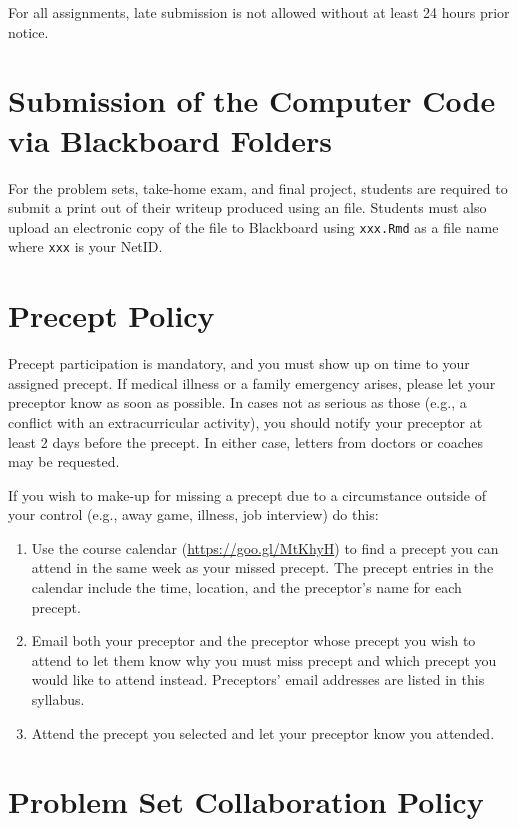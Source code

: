 \documentclass[11pt]{article}
\begin{document}
For all assignments, late submission is not allowed without at least
24 hours prior notice.

\section{Submission of the Computer Code via Blackboard Folders}

For the problem sets, take-home exam, and final project, students are
required to submit a print out of their writeup produced using an
\Rmarkdown{} file.  Students must also upload an electronic copy of
the \Rmarkdown{} file to Blackboard using {\tt xxx.Rmd} as a file name
where {\tt xxx} is your NetID.

\section{Precept Policy}

Precept participation is mandatory, and you must show up on time to
your assigned precept.  If medical illness or a family emergency
arises, please let your preceptor know as soon as possible. In cases
not as serious as those (e.g., a conflict with an extracurricular
activity), you should notify your preceptor at least 2 days before the
precept. In either case, letters from doctors or coaches may be requested.

If you wish to make-up for missing a precept due to a circumstance outside of your control (e.g., away game, illness, job interview) do this:
  \begin{enumerate}
  \item Use the course calendar (\url{https://goo.gl/MtKhyH}) to find a precept you can attend in the same week as your missed precept. The precept entries in the calendar include the time, location, and the preceptor's name for each precept. 
  \item Email both your preceptor and the preceptor whose precept you wish to attend to let them know why you must miss precept and which precept you would like to attend instead. Preceptors' email addresses are listed in this syllabus. 
  \item Attend the precept you selected and let your preceptor know you attended. 
  \end{enumerate}

\section{Problem Set Collaboration Policy}
\end{document}
